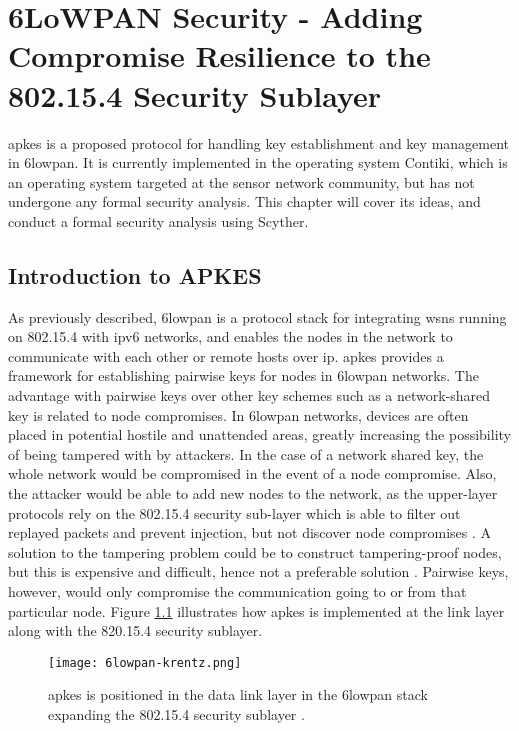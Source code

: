 \chapter{6LoWPAN Security - Adding Compromise Resilience to the 802.15.4 Security Sublayer}
\label{chp:krentz-6lowpan}


\gls{apkes} is a proposed protocol for handling key establishment and key management in \gls{6lowpan}. It is currently implemented in the operating system Contiki, which is an operating system targeted at the sensor network community, but has not undergone any formal security analysis. This chapter will cover its ideas, and conduct a formal security analysis using Scyther. 

\section{Introduction to APKES}

As previously described, \gls{6lowpan} is a protocol stack for integrating \gls{wsn}s running on 802.15.4 with \gls{ip}v6 networks, and enables the nodes in the network to communicate with each other or remote hosts over \gls{ip}. \gls{apkes} provides a framework for establishing pairwise keys for nodes in \gls{6lowpan} networks. The advantage with pairwise keys over other key schemes such as a network-shared key is related to node compromises. In \gls{6lowpan} networks, devices are often placed in potential hostile and unattended areas, greatly increasing the possibility of being tampered with by attackers. In the case of a network shared key, the whole network would be compromised in the event of a node compromise. Also, the attacker would be able to add new nodes to the network, as the upper-layer protocols rely on the 802.15.4 security sub-layer which is able to filter out replayed packets and prevent injection, but not discover node compromises \cite{krentz20136lowpan}. A solution to the tampering problem could be to construct tampering-proof nodes, but this is expensive and difficult, hence not a preferable solution \cite{anderson1996tamper}. Pairwise keys, however, would only compromise the communication going to or from that particular node. Figure \ref{fig:6lowpan-krentz} illustrates how \gls{apkes} is implemented at the link layer along with the 820.15.4 security sublayer.

\begin{figure}
	\centering
	\texttt{[image: 6lowpan-krentz.png]}
	\caption{\gls{apkes} is positioned in the data link layer in the \gls{6lowpan} stack expanding the 802.15.4 security sublayer \cite{krentz20136lowpan}.}
	\label{fig:6lowpan-krentz}
\end{figure}


